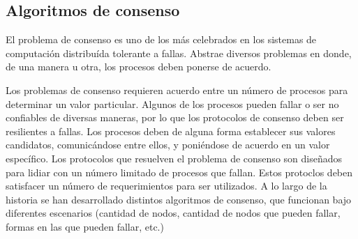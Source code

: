 

\subsection{Algoritmos de consenso}\label{subsubsec:consensus}
El problema de consenso es uno de los más celebrados en los sistemas de computación distribuída tolerante a fallas.
%
Abstrae diversos problemas en donde, de una manera u otra, los procesos deben ponerse de acuerdo.
%

Los problemas de consenso requieren acuerdo entre un número de procesos para determinar un valor particular.
%
Algunos de los procesos pueden fallar o ser no confiables de diversas maneras, por lo que los protocolos de
consenso deben ser resilientes a fallas.
%
Los procesos deben de alguna forma establecer sus valores candidatos, comunicándose entre ellos, y
poniéndose de acuerdo en un valor específico.
%
Los protocolos que resuelven el problema de consenso son diseñados para lidiar con un número limitado de procesos
que fallan.
%
Estos protoclos deben satisfacer un número de requerimientos para ser utilizados.
%
A lo largo de la historia se han desarrollado distintos algoritmos de consenso, que funcionan bajo diferentes
escenarios (cantidad de nodos, cantidad de nodos que pueden fallar, formas en las que pueden fallar, etc.)

